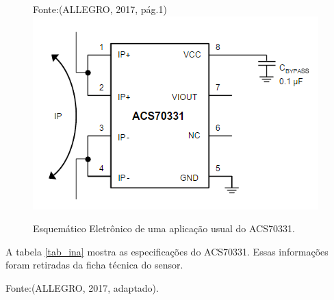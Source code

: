 \begin{figure}[h]
\footnotesize{
	\centering
	Fonte:(ALLEGRO, 2017, pág.1)\linebreak
	\includegraphics[keepaspectratio=true,scale=0.52]{figuras/currentSensor.PNG}
	\caption{Esquemático Eletrônico de uma aplicação usual do ACS70331.}
	\label{fig20}
}
\end{figure}
\FloatBarrier

A tabela \ref{tab_ina} mostra as especificações do ACS70331. Essas informações foram retiradas da ficha técnica do sensor.

\begin{table}[h]
	\centering
	\caption{Informações técnicas do ACS70331.}
	\label{tab_ina}
	\centering
\footnotesize{Fonte:(ALLEGRO, 2017, adaptado).}
\end{table}

